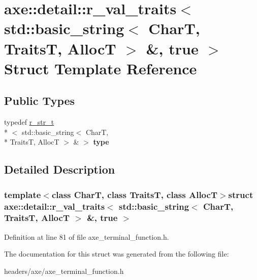 \hypertarget{structaxe_1_1detail_1_1r__val__traits_3_01std_1_1basic__string_3_01CharT_00_01TraitsT_00_01AllocT_01_4_01_6_00_01true_01_4}{\section{axe\+:\+:detail\+:\+:r\+\_\+val\+\_\+traits$<$ std\+:\+:basic\+\_\+string$<$ Char\+T, Traits\+T, Alloc\+T $>$ \&, true $>$ Struct Template Reference}
\label{structaxe_1_1detail_1_1r__val__traits_3_01std_1_1basic__string_3_01CharT_00_01TraitsT_00_01AllocT_01_4_01_6_00_01true_01_4}
}
\subsection*{Public Types}
\begin{DoxyCompactItemize}
\item 
\hypertarget{structaxe_1_1detail_1_1r__val__traits_3_01std_1_1basic__string_3_01CharT_00_01TraitsT_00_01AllocT_01_4_01_6_00_01true_01_4_ae3000698890d36f42cc84918a2ee9421}{typedef \hyperlink{classaxe_1_1r__str__t}{r\+\_\+str\+\_\+t}\\*
$<$ std\+::basic\+\_\+string$<$ Char\+T, \\*
Traits\+T, Alloc\+T $>$ \& $>$ {\bfseries type}}\label{structaxe_1_1detail_1_1r__val__traits_3_01std_1_1basic__string_3_01CharT_00_01TraitsT_00_01AllocT_01_4_01_6_00_01true_01_4_ae3000698890d36f42cc84918a2ee9421}

\end{DoxyCompactItemize}


\subsection{Detailed Description}
\subsubsection*{template$<$class Char\+T, class Traits\+T, class Alloc\+T$>$struct axe\+::detail\+::r\+\_\+val\+\_\+traits$<$ std\+::basic\+\_\+string$<$ Char\+T, Traits\+T, Alloc\+T $>$ \&, true $>$}



Definition at line 81 of file axe\+\_\+terminal\+\_\+function.\+h.



The documentation for this struct was generated from the following file\+:\begin{DoxyCompactItemize}
\item 
headers/axe/axe\+\_\+terminal\+\_\+function.\+h\end{DoxyCompactItemize}
